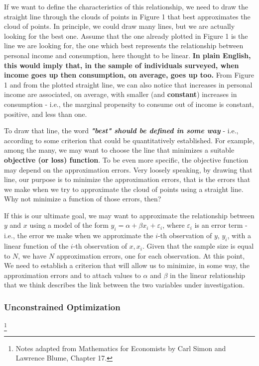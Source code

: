 If we want to define the characteristics of this relationship, we need to draw the straight line through the clouds of points in Figure 1 that best approximates the cloud of points. In principle, we could draw many lines, but we are actually looking for the best one. Assume that the one already plotted in Figure 1 is the line we are looking for, the one which best represents the relationship between personal income and consumption, here thought to be linear. \textbf{In plain English, this would imply that, in the sample of individuals surveyed, when income goes up then consumption, on average, goes up too.} From Figure 1 and from the plotted straight line, we can also notice that increases in personal income are associated, on average, with smaller (and \textbf{constant}) increases in consumption - i.e., the marginal propensity to consume out of income is constant, positive, and less than one.

To draw that line, the word \textbf{\textit{"best" should be defined in some way}} - i.e., according to some criterion that could be quantitatively established. For example, among the many, we may want to choose the line that minimizes a suitable \textbf{objective (or loss) function}. To be even more specific, the objective function may depend on the approximation errors. Very loosely speaking, by drawing that line, our purpose is to minimize the approximation errors, that is the errors that we make when we try to approximate the cloud of points using a straight line. Why not minimize a function of those errors, then?

If this is our ultimate goal, we may want to approximate the relationship between $y$ and $x$ using a model of the form $y_{i}=\alpha+\beta x_{i}+\varepsilon_{i}$, where $\varepsilon_{i}$ is an error term - i.e., the error we make when we approximate the $i$-th observation of $y$, $y_{i}$, with a linear function of the $i$-th observation of $x, x_{i}$. Given that the sample size is equal to $N$, we have $N$ approximation errors, one for each observation. At this point, We need to establish a criterion that will allow us to minimize, in some way, the approximation errors and to attach values to $\alpha$ and $\beta$ in the linear relationship that we think describes the link between the two variables under investigation.

\subsubsection{Unconstrained Optimization}\footnote{Notes adapted from Mathematics for Economists by Carl Simon and Lawrence Blume, Chapter 17.}

